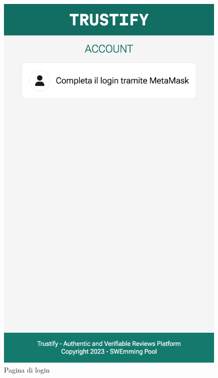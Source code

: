 \begin{figure}[H]
      \includegraphics[width=\linewidth]{src/img/login.png}
      \caption{Pagina di login}\label{fig:login}
    \endminipage\hfill

\end{figure}
